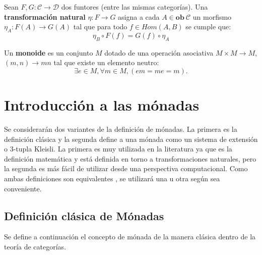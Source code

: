 \begin{definition}
Sean $\mathit{F}, \mathit{G} : \mathscr{C} \rightarrow \mathscr{D}$ dos funtores (entre las mismas categorías). Una \textbf{transformación natural} $\eta : \mathit{F} \rightarrow \mathit{G}$ asigna a cada $A \in \mathbf{ob} \ \mathscr{C}$ un morfismo $\eta_A : \mathit{F}(A) \rightarrow \mathit{G}(A)$ tal que para todo $f \in Hom(A,B)$ se cumple que: 
\begin{equation*}
	\eta_B \circ \mathit{F}(f) = \mathit{G}(f) \circ \eta_A 
\end{equation*}
\end{definition}

\begin{definition}[Monoide]
Un \textbf{monoide} es un conjunto $M$ dotado de una operación asociativa $M \times M \rightarrow M$, $(m,n) \rightarrow mn$ tal que existe un elemento neutro:
\begin{equation*}
\exists e \in M, \forall m \in M, (em = me = m).
\end{equation*}
\end{definition}

\section{Introducción a las mónadas}\label{monconc:monadas}

Se considerarán dos variantes de la definición de mónadas. La primera es la definición clásica y la segunda define a una mónada como un sistema de extensión o 3-tupla Kleisli. La primera es muy utilizada en la literatura ya que es la definición matemática y está definida en torno a transformaciones naturales, pero la segunda es más fácil de utilizar desde una perspectiva computacional. Como ambas definiciones son equivalentes \cite{moggi:1991}, se utilizará una u otra según sea conveniente.

\subsection{Definición clásica de Mónadas}\label{monadas:usual}
Se define a continuación el concepto de mónada de la manera clásica dentro de la teoría de categorías.

